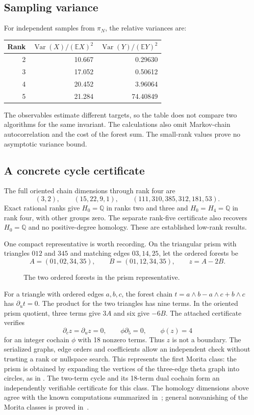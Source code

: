\documentclass[11pt]{article}
\theoremstyle{definition}
\newcommand{\E}{\mathbb E}
\newcommand{\Q}{\mathbb Q}
\newcommand{\Var}{\operatorname{Var}}
\numberwithin{equation}{section}
\begin{document}
\subsection{Sampling variance}
For independent samples from $\pi_N$, the relative variances are:
\begin{center}
\begin{tabular}{rrr}
\toprule
Rank & $\Var(X)/(\E X)^2$ & $\Var(Y)/(\E Y)^2$\\
\midrule
2 & 10.667 & 0.29630\\
3 & 17.052 & 0.50612\\
4 & 20.452 & 3.96064\\
5 & 21.284 & 74.40849\\
\bottomrule
\end{tabular}
\end{center}
The observables estimate different targets, so the table does not
compare two algorithms for the same invariant. The calculations also
omit Markov-chain autocorrelation and the cost of the forest sum.
The small-rank values prove no asymptotic variance bound.

\subsection{A concrete cycle certificate}
The full oriented chain dimensions through rank four are
\[
 (3,2),\qquad (15,22,9,1),\qquad (111,310,385,312,181,53).
\]
Exact rational ranks give $H_0=\Q$ in ranks two and three and
$H_0=H_4=\Q$ in rank four, with other groups zero.
The separate rank-five certificate also recovers $H_0=\Q$ and no
positive-degree homology. These are established low-rank results.

One compact representative is worth recording. On the triangular
prism with triangles $012$ and $345$ and matching edges $03,14,25$,
let the ordered forests be
\[
 A=(01,02,34,35),\qquad B=(01,12,34,35),\qquad z=A-2B.
\]
\begin{figure}[ht]
\centering

\caption{The two ordered forests in the prism representative.}
\end{figure}
For a triangle with ordered edges $a,b,c$, the forest chain
$t=a\wedge b-a\wedge c+b\wedge c$ has $\partial_u t=0$.
The product for the two triangles has nine terms. In the oriented
prism quotient, three terms give $3A$ and six give $-6B$.
The attached certificate verifies
\[
 \partial_c z=\partial_u z=0,\qquad
 \phi\partial_5=0,\qquad \phi(z)=4
\]
for an integer cochain $\phi$ with 18 nonzero terms. Thus $z$ is
not a boundary. The serialized graphs, edge orders and coefficients
allow an independent check without trusting a rank or nullspace search.
This represents the first Morita class: the prism is obtained by
expanding the vertices of the three-edge theta graph into circles,
as in \cite[Section 6.1]{Morita}. The two-term cycle and its 18-term
dual cochain form an independently verifiable certificate for this
class. The homology dimensions above agree with the known computations
summarized in~\cite{GVW}; general nonvanishing of the Morita classes
is proved in~\cite{KMP}.
\end{document}

